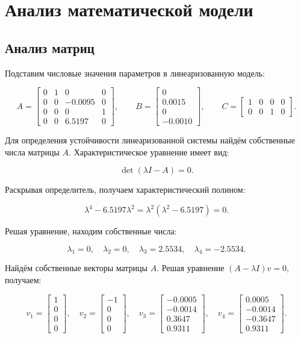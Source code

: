 \documentclass[a4paper,12pt]{article}
\begin{document}
		\newpage
\section{Анализ математической модели}

\subsection{Анализ матриц}

Подставим числовые значения параметров в линеаризованную модель:

\[
A = \begin{bmatrix}
	0 & 1 & 0 & 0 \\
	0 & 0 & -0.0095 & 0 \\
	0 & 0 & 0 & 1 \\
	0 & 0 & 6.5197 & 0
\end{bmatrix}, \qquad
B = \begin{bmatrix}
	0 \\ 0.0015 \\ 0 \\ -0.0010
\end{bmatrix}, \qquad
C = \begin{bmatrix}
	1 & 0 & 0 & 0 \\
	0 & 0 & 1 & 0
\end{bmatrix}.
\]

Для определения устойчивости линеаризованной системы найдём собственные числа матрицы \(A\). Характеристическое уравнение имеет вид:

\[
\det(\lambda I - A) = 0.
\]

Раскрывая определитель, получаем характеристический полином:

\[
\lambda^4 - 6.5197\lambda^2 = \lambda^2(\lambda^2 - 6.5197) = 0.
\]

Решая уравнение, находим собственные числа:

\[
\lambda_1 = 0, \quad \lambda_2 = 0, \quad \lambda_3 = 2.5534, \quad \lambda_4 = -2.5534.
\]

Найдём собственные векторы матрицы $A$. Решая уравнение $(A - \lambda I)v = 0$, получаем:

\[
v_1 = \begin{bmatrix} 1 \\ 0 \\ 0 \\ 0 \end{bmatrix}, \quad
v_2 = \begin{bmatrix} -1 \\ 0 \\ 0 \\ 0 \end{bmatrix}, \quad
v_3 = \begin{bmatrix} -0.0005 \\ -0.0014 \\ 0.3647 \\ 0.9311 \end{bmatrix}, \quad
v_4 = \begin{bmatrix} 0.0005 \\ -0.0014 \\ -0.3647 \\ 0.9311 \end{bmatrix}.
\]
\end{document}
